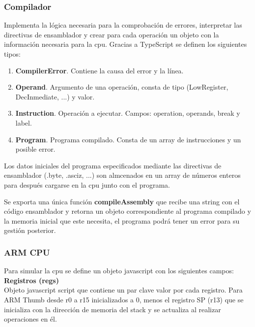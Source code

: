 {        \subsubsection{Compilador}
        Implementa la lógica necesaria para la comprobación de errores, interpretar las directivas de ensamblador
        y crear para cada operación un objeto con la información necesaria para la cpu.
        Gracias a TypeScript se definen los siguientes tipos:
        \begin{enumerate}
            \item \textbf{CompilerError}. Contiene la causa del error y la línea.
            \item \textbf{Operand}. Argumento de una operación, consta de tipo (LowRegister, DecInmediate, ...) y valor.
            \item \textbf{Instruction}. Operación a ejecutar. Campos: operation, operands, break y label.
            \item \textbf{Program}. Programa compilado. Consta de un array de instrucciones y un posible error.
        \end{enumerate}

        Los datos iniciales del programa especificados mediante las directivas de ensamblador (.byte, .asciz, ...)
        son almcenados en un array de números enteros para después cargarse en la cpu junto con el programa.

        Se exporta una única función \textbf{compileAssembly} que recibe una string con el código ensamblador y retorna un objeto
        correspondiente al programa compilado y la memoria inicial que este necesita, el programa podrá tener un error
        para su gestión posterior. 

        \subsubsection{ARM CPU}
        Para simular la cpu se define un objeto javascript con los siguientes campos: \\

        \textbf{Registros (regs)} \\
        Objeto javascript script que contiene un par clave valor por cada registro.
        Para ARM Thumb desde r0 a r15 inicializados a 0, menos el registro SP (r13)
        que se inicializa con la dirección de memoria del stack y se actualiza al realizar operaciones en él. \\

}
